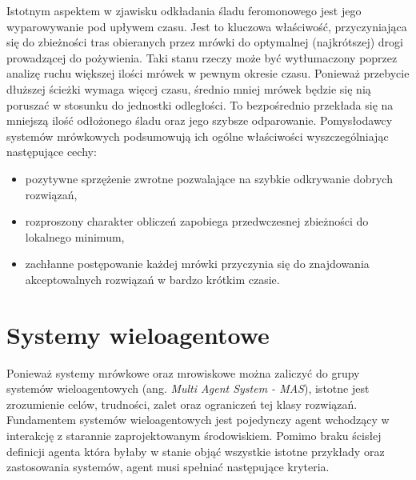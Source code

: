 {    Istotnym aspektem w zjawisku odkładania śladu feromonowego jest jego wyparowywanie pod upływem czasu. Jest to
    kluczowa właściwość, przyczyniająca się do zbieżności tras obieranych przez mrówki do optymalnej (najkrótszej) drogi
    prowadzącej do pożywienia. Taki stanu rzeczy może być wytłumaczony poprzez analizę ruchu większej ilości mrówek w
    pewnym okresie czasu. Ponieważ przebycie dłuższej ścieżki wymaga więcej czasu, średnio mniej mrówek będzie się nią
    poruszać w stosunku do jednostki odległości. To bezpośrednio przekłada się na mniejszą ilość odłożonego śladu oraz
    jego szybsze odparowanie. Pomysłodawcy systemów mrówkowych podsumowują ich ogólne właściwości wyszczególniając
    następujące cechy\cite{Dorigo1991AntSA}:

    \begin{itemize}
        \item pozytywne sprzężenie zwrotne pozwalające na szybkie odkrywanie dobrych rozwiązań,
        \item rozproszony charakter obliczeń zapobiega przedwczesnej zbieżności do lokalnego minimum,
        \item zachłanne postępowanie każdej mrówki przyczynia się do znajdowania akceptowalnych rozwiązań w bardzo
        krótkim czasie.
    \end{itemize}


    \section{Systemy wieloagentowe}
    {
        Ponieważ systemy mrówkowe oraz mrowiskowe można zaliczyć do grupy systemów wieloagentowych (ang. \textit{Multi
        Agent System - MAS}), istotne jest zrozumienie celów, trudności, zalet oraz ograniczeń tej klasy rozwiązań.
        Fundamentem systemów wieloagentowych jest pojedynczy agent wchodzący w interakcję z starannie zaprojektowanym
        środowiskiem. Pomimo braku ścisłej definicji agenta która byłaby w stanie objąć wszystkie istotne przykłady oraz
        zastosowania systemów, agent musi spełniać następujące kryteria\cite{Balaji2010AnIT}.

}}
